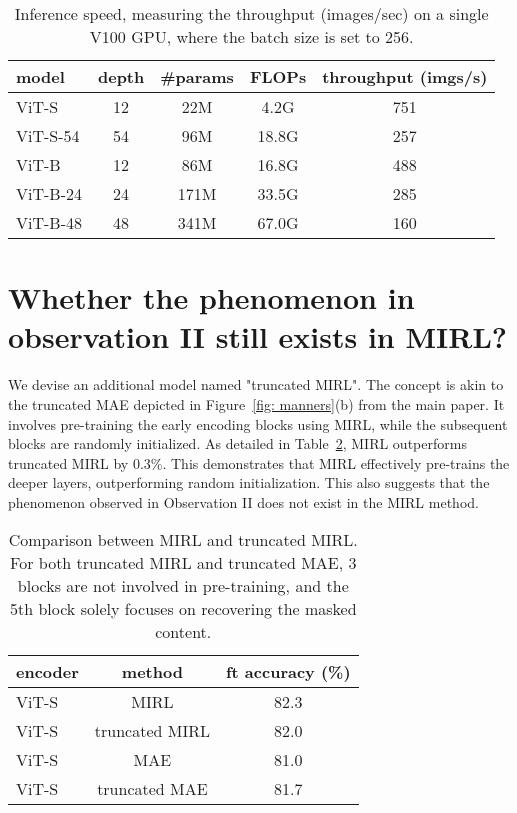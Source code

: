 \documentclass{article}
\begin{document}
\begin{table}[!t]
    \centering
    \small
    \renewcommand{\arraystretch}{1.1}
    \setlength{\tabcolsep}{14.1pt}
    \begin{tabular}{@{}l c c c c@{}}
    \\
    \toprule
     model & depth  & \#params & FLOPs & throughput (imgs/s)  \\
    \midrule
    ViT-S & 12 & 22M & 4.2G & 751  \\
    ViT-S-54 & 54 & 96M & 18.8G & 257  \\
    ViT-B & 12 & 86M & 16.8G & 488  \\
    ViT-B-24 & 24 & 171M & 33.5G & 285  \\
    ViT-B-48 & 48 & 341M & 67.0G & 160 \\
    \bottomrule
    \end{tabular}
    \caption{Inference speed, measuring the throughput (images/sec) on a single V100 GPU, where the batch size is set to 256.}
    \label{tab: infer_speed}
\end{table}

\section{Whether the phenomenon in observation II still exists in MIRL?}
We devise an additional model named "truncated MIRL". The concept is akin to the truncated MAE depicted in Figure~\ref{fig: manners}(b) from the main paper. It involves pre-training the early encoding blocks using MIRL, while the subsequent blocks are randomly initialized. As detailed in Table~\ref{tab: truncatedMIRL}, MIRL outperforms truncated MIRL by 0.3\%. This demonstrates that MIRL effectively pre-trains the deeper layers, outperforming random initialization. This also suggests that the phenomenon observed in Observation II does not exist in the MIRL method. 
\begin{table}[!t]
    \centering
    \small
    \renewcommand{\arraystretch}{1.1}
    \setlength{\tabcolsep}{14.1pt}
    \begin{tabular}{@{}l c c@{}}
    \\
    \toprule
     encoder & method  & ft accuracy (\%) \\
    \midrule
    ViT-S & MIRL & 82.3  \\
    ViT-S & truncated MIRL & 82.0  \\
    ViT-S & MAE & 81.0  \\
    ViT-S & truncated MAE & 81.7  \\
    \bottomrule
    \end{tabular}
    \caption{Comparison between MIRL and truncated MIRL. For both truncated MIRL and truncated MAE, 3 blocks are not involved in pre-training, and the 5th block solely focuses on recovering the masked content.}
    \label{tab: truncatedMIRL}
\end{table}
\end{document}
